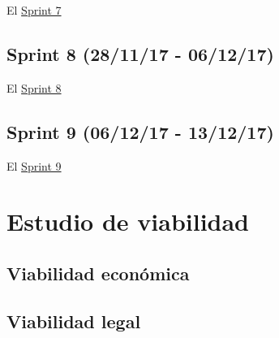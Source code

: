 El \href{https://github.com/trona85/GII-17.1B-UBULog-1.0/milestone/7?closed=1}{Sprint 7} 


\subsection{Sprint 8 (28/11/17 -
	06/12/17)}\label{sprint-8-281117---061217}

El \href{https://github.com/trona85/GII-17.1B-UBULog-1.0/milestone/8?closed=1}{Sprint 8} 


\subsection{Sprint 9 (06/12/17 -
	13/12/17)}\label{sprint-8-061217---131217}

El \href{https://github.com/trona85/GII-17.1B-UBULog-1.0/milestone/9?closed=1}{Sprint 9}




\section{Estudio de viabilidad}

\subsection{Viabilidad económica}

\subsection{Viabilidad legal}


